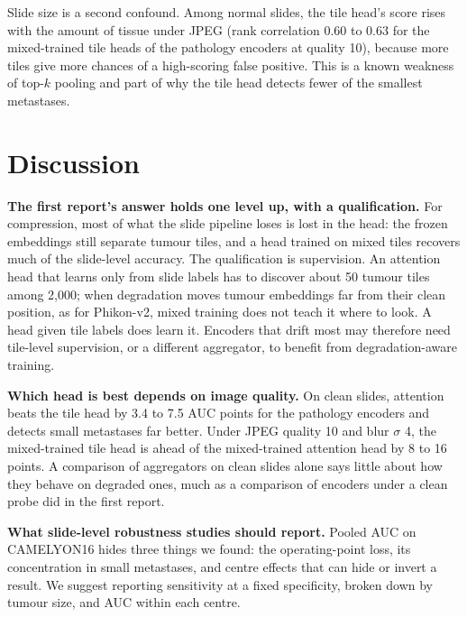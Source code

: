 \documentclass[11pt,a4paper]{article}
\begin{document}
Slide size is a second confound. Among normal slides, the tile head's score rises with the amount of tissue under JPEG (rank correlation 0.60 to 0.63 for the mixed-trained tile heads of the pathology encoders at quality 10), because more tiles give more chances of a high-scoring false positive. This is a known weakness of top-$k$ pooling and part of why the tile head detects fewer of the smallest metastases.

\begin{table}[h]\centering\small
\caption{Attention MIL by centre, on clean slides and at blur $\sigma$ 4. AUC in \%, mean of five seeds: tumour against normal slides within each centre; micrometastasis slides against normal slides within each centre; and how well the score separates UMCU from RUMC among normal slides (50 = not at all).}
\label{tab:hospital}
\setlength{\tabcolsep}{4pt}
\resizebox{\linewidth}{!}{}
\end{table}

\section{Discussion}

\textbf{The first report's answer holds one level up, with a qualification.} For compression, most of what the slide pipeline loses is lost in the head: the frozen embeddings still separate tumour tiles, and a head trained on mixed tiles recovers much of the slide-level accuracy. The qualification is supervision. An attention head that learns only from slide labels has to discover about 50 tumour tiles among 2,000; when degradation moves tumour embeddings far from their clean position, as for Phikon-v2, mixed training does not teach it where to look. A head given tile labels does learn it. Encoders that drift most may therefore need tile-level supervision, or a different aggregator, to benefit from degradation-aware training.

\textbf{Which head is best depends on image quality.} On clean slides, attention beats the tile head by 3.4 to 7.5 AUC points for the pathology encoders and detects small metastases far better. Under JPEG quality 10 and blur $\sigma$ 4, the mixed-trained tile head is ahead of the mixed-trained attention head by 8 to 16 points. A comparison of aggregators on clean slides alone says little about how they behave on degraded ones, much as a comparison of encoders under a clean probe did in the first report.

\textbf{What slide-level robustness studies should report.} Pooled AUC on CAMELYON16 hides three things we found: the operating-point loss, its concentration in small metastases, and centre effects that can hide or invert a result. We suggest reporting sensitivity at a fixed specificity, broken down by tumour size, and AUC within each centre.
\end{document}
